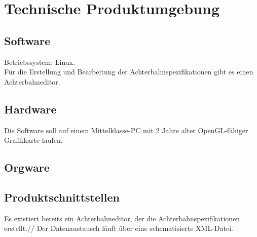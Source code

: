 
\chapter{Technische Produktumgebung}

\section{Software}
Betriebssystem: Linux.\\
Für die Erstellung und Bearbeitung der Achterbahnspezifikationen gibt es einen Achterbahneditor.\\


\section{Hardware}
Die Software soll auf einem Mittelklasse-PC mit 2 Jahre alter OpenGL-fähiger Grafikkarte laufen.


\section{Orgware}




\section{Produktschnittstellen}
Es existiert bereits ein Achterbahneditor, der die Achterbahnspezifikationen erstellt.//
Der Datenaustausch läuft über eine schematisierte XML-Datei.
